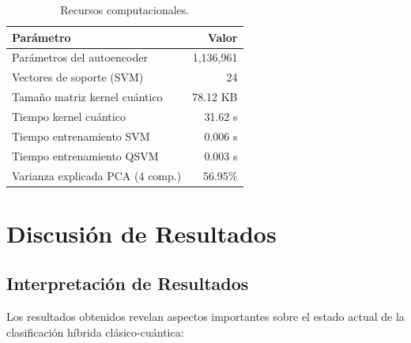 \documentclass[conference]{IEEEtran}
\begin{document}
\begin{table}[H]
    \centering
    \caption{Recursos computacionales.}
    \label{tab:recursos}
    \begin{tabular}{lr}
        \toprule
        \textbf{Parámetro} & \textbf{Valor} \\
        \midrule
        Parámetros del autoencoder & 1,136,961 \\
        Vectores de soporte (SVM) & 24 \\
        Tamaño matriz kernel cuántico & 78.12 KB \\
        Tiempo kernel cuántico & 31.62 s \\
        Tiempo entrenamiento SVM & 0.006 s \\
        Tiempo entrenamiento QSVM & 0.003 s \\
        Varianza explicada PCA (4 comp.) & 56.95\% \\
        \bottomrule
    \end{tabular}
\end{table}

\section{Discusión de Resultados}
\label{sec:discusion}

\subsection{Interpretación de Resultados}

Los resultados obtenidos revelan aspectos importantes sobre el estado actual 
de la clasificación híbrida clásico-cuántica:
\end{document}
